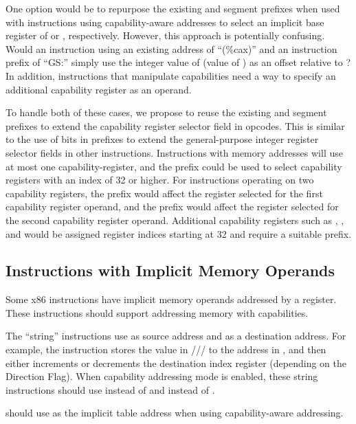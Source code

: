 One option would be to repurpose the existing \FS{} and \GS{} segment
prefixes when used with instructions using capability-aware addresses
to select an implicit base register of \CFS{} or \CGS{}, respectively.
However, this approach is potentially confusing.  Would an instruction
using an existing address of ``(\%cax)'' and an instruction prefix of
``GS:'' simply use the integer value of \CAX{} (value of \RAX{}) as an offset
relative to \CGS{}?  In addition, instructions that manipulate
capabilities need a way to specify an additional capability register
as an operand.

To handle both of these cases, we propose to reuse the existing \FS{} and
\GS{} segment prefixes to extend the capability register selector field
in opcodes.  This is similar to the use of bits in \REX{} prefixes to
extend the general-purpose integer register selector fields in other
instructions.  Instructions with memory addresses will use at most one
capability-register, and the \FS{} prefix could be used to select
capability registers with an index of 32 or higher.  For instructions
operating on two capability registers, the \FS{} prefix would affect the
register selected for the first capability register operand, and the
\GS{} prefix would affect the register selected for the second capability
register operand.  Additional capability registers such as \DDC{}, \CFS{},
and \CGS{} would be assigned register indices starting at 32 and require
a suitable prefix.

\subsection{Instructions with Implicit Memory Operands}

Some x86 instructions have implicit memory operands addressed by a
register.  These instructions should support addressing memory with
capabilities.

The ``string''
instructions use \RSI{} as source address and \RDI{} as a destination address.
For example, the
 instruction stores the value in \AL{}/\AX{}/\EAX{}/\RAX{} to the address in
\RDI{}, and then either increments or decrements the destination
index register (depending on the Direction Flag).  When capability
addressing mode is enabled,
these string instructions should use \CSI{} instead of \RSI{} and \CDI{} instead of
\RDI{}.

 should use \CBX{} as the implicit table address when
using capability-aware addressing.

